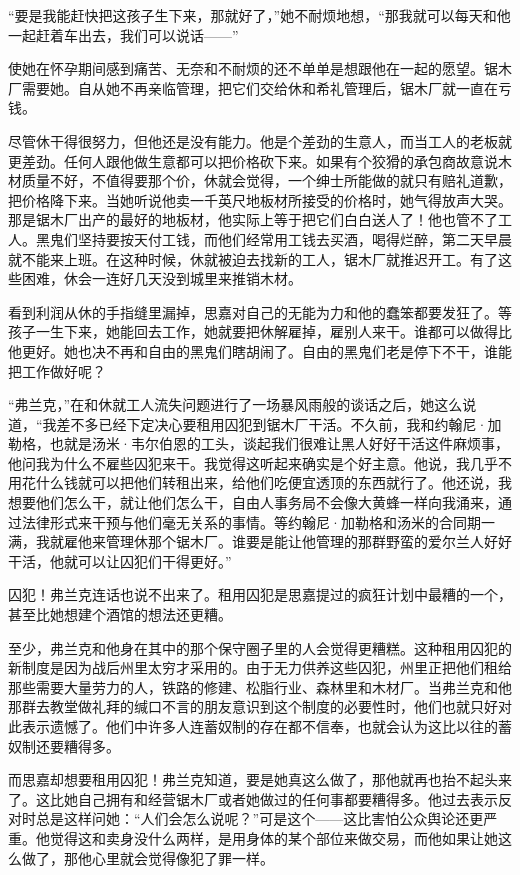 \par “要是我能赶快把这孩子生下来，那就好了，”她不耐烦地想，“那我就可以每天和他一起赶着车出去，我们可以说话——”
\par 使她在怀孕期间感到痛苦、无奈和不耐烦的还不单单是想跟他在一起的愿望。锯木厂需要她。自从她不再亲临管理，把它们交给休和希礼管理后，锯木厂就一直在亏钱。
\par 尽管休干得很努力，但他还是没有能力。他是个差劲的生意人，而当工人的老板就更差劲。任何人跟他做生意都可以把价格砍下来。如果有个狡猾的承包商故意说木材质量不好，不值得要那个价，休就会觉得，一个绅士所能做的就只有赔礼道歉，把价格降下来。当她听说他卖一千英尺地板材所接受的价格时，她气得放声大哭。那是锯木厂出产的最好的地板材，他实际上等于把它们白白送人了！他也管不了工人。黑鬼们坚持要按天付工钱，而他们经常用工钱去买酒，喝得烂醉，第二天早晨就不能来上班。在这种时候，休就被迫去找新的工人，锯木厂就推迟开工。有了这些困难，休会一连好几天没到城里来推销木材。
\par 看到利润从休的手指缝里漏掉，思嘉对自己的无能为力和他的蠢笨都要发狂了。等孩子一生下来，她能回去工作，她就要把休解雇掉，雇别人来干。谁都可以做得比他更好。她也决不再和自由的黑鬼们瞎胡闹了。自由的黑鬼们老是停下不干，谁能把工作做好呢？
\par “弗兰克，”在和休就工人流失问题进行了一场暴风雨般的谈话之后，她这么说道，“我差不多已经下定决心要租用囚犯到锯木厂干活。不久前，我和约翰尼·加勒格，也就是汤米·韦尔伯恩的工头，谈起我们很难让黑人好好干活这件麻烦事，他问我为什么不雇些囚犯来干。我觉得这听起来确实是个好主意。他说，我几乎不用花什么钱就可以把他们转租出来，给他们吃便宜透顶的东西就行了。他还说，我想要他们怎么干，就让他们怎么干，自由人事务局不会像大黄蜂一样向我涌来，通过法律形式来干预与他们毫无关系的事情。等约翰尼·加勒格和汤米的合同期一满，我就雇他来管理休那个锯木厂。谁要是能让他管理的那群野蛮的爱尔兰人好好干活，他就可以让囚犯们干得更好。”
\par 囚犯！弗兰克连话也说不出来了。租用囚犯是思嘉提过的疯狂计划中最糟的一个，甚至比她想建个酒馆的想法还更糟。
\par 至少，弗兰克和他身在其中的那个保守圈子里的人会觉得更糟糕。这种租用囚犯的新制度是因为战后州里太穷才采用的。由于无力供养这些囚犯，州里正把他们租给那些需要大量劳力的人，铁路的修建、松脂行业、森林里和木材厂。当弗兰克和他那群去教堂做礼拜的缄口不言的朋友意识到这个制度的必要性时，他们也就只好对此表示遗憾了。他们中许多人连蓄奴制的存在都不信奉，也就会认为这比以往的蓄奴制还要糟得多。
\par 而思嘉却想要租用囚犯！弗兰克知道，要是她真这么做了，那他就再也抬不起头来了。这比她自己拥有和经营锯木厂或者她做过的任何事都要糟得多。他过去表示反对时总是这样问她：“人们会怎么说呢？”可是这个——这比害怕公众舆论还更严重。他觉得这和卖身没什么两样，是用身体的某个部位来做交易，而他如果让她这么做了，那他心里就会觉得像犯了罪一样。
